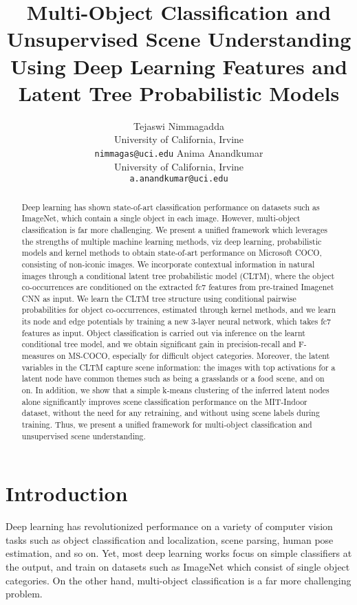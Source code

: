 \documentclass{article}
\title{ Multi-Object Classification and Unsupervised Scene Understanding Using Deep Learning Features and
Latent Tree Probabilistic Models}
\author{Tejaswi Nimmagadda\\
University of California, Irvine\\
\texttt{nimmagas@uci.edu}
\And
Anima Anandkumar\\
University of California, Irvine\\
\texttt{a.anandkumar@uci.edu}
}
\begin{document}
\maketitle

\begin{abstract}

Deep learning has shown state-of-art classification  performance on datasets such as ImageNet, which  contain a single object in each image. However, multi-object classification  is  far more challenging.   We present a unified framework which leverages the strengths of multiple machine learning methods, viz deep learning, probabilistic models and kernel methods to obtain state-of-art performance on Microsoft COCO, consisting of non-iconic images. We  incorporate contextual information  in natural images through a conditional latent tree probabilistic model (CLTM), where the object co-occurrences are conditioned on the    extracted fc7 features from  pre-trained Imagenet  CNN as input.   We learn the CLTM tree structure  using conditional pairwise probabilities for object co-occurrences, estimated through  kernel methods, and we learn its node and edge potentials by training a new 3-layer neural network, which takes fc7 features as input. Object classification is carried out via inference on the learnt conditional tree model, and  we obtain  significant  gain in precision-recall and F-measures on MS-COCO, especially for  difficult object categories. Moreover, the latent variables in the CLTM capture scene information: the images with top activations for a latent node have common  themes such as being a grasslands or a food scene,  and on on. In addition, we show that a simple  k-means clustering of the inferred latent nodes alone significantly improves scene classification performance on   the MIT-Indoor dataset, without the need for any retraining, and without using  scene labels during training. Thus, we present a unified framework for multi-object classification and unsupervised scene understanding.
\end{abstract}



\section{Introduction}

Deep learning has revolutionized performance on a variety of computer vision tasks such as object classification and localization, scene parsing, human pose estimation, and so on. Yet, most deep learning works focus on simple classifiers at the output, and train on   datasets such as ImageNet which consist of single object categories. On the other hand, multi-object classification is a far more challenging problem.
\end{document}
